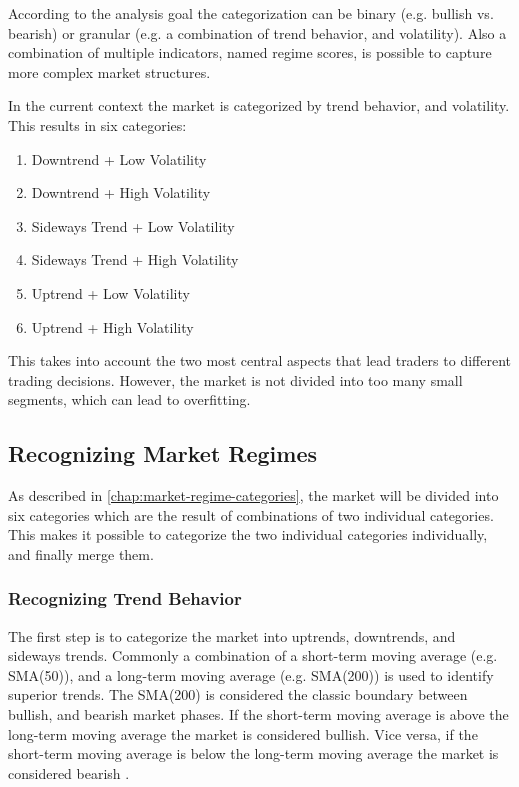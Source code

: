 According to the analysis goal the categorization can be binary (e.g.
bullish vs.
bearish) or granular (e.g.
a combination of trend behavior, and volatility).
Also a combination of multiple indicators, named regime scores, is possible to capture more complex market structures.

In the current context the market is categorized by trend behavior, and volatility.
This results in six categories:

\begin{enumerate}
    \item Downtrend + Low Volatility
    \item Downtrend + High Volatility
    \item Sideways Trend + Low Volatility
    \item Sideways Trend + High Volatility
    \item Uptrend + Low Volatility
    \item Uptrend + High Volatility
\end{enumerate}

This takes into account the two most central aspects that lead traders to different trading decisions.
However, the market is not divided into too many small segments, which can lead to overfitting.

\subsection{Recognizing Market Regimes}

As described in \autoref{chap:market-regime-categories}, the market will be divided into six categories which are the result of combinations of two individual categories.
This makes it possible to categorize the two individual categories individually, and finally merge them.

\subsubsection{Recognizing Trend Behavior}
\label{chap:recognizing-trend}

The first step is to categorize the market into uptrends, downtrends, and sideways trends.
Commonly a combination of a short-term moving average (e.g.
SMA(50)), and a long-term moving average (e.g.
SMA(200)) is used to identify superior trends.
The SMA(200) is considered the classic boundary between bullish, and bearish market phases.
If the short-term moving average is above the long-term moving average the market is considered bullish.
Vice versa, if the short-term moving average is below the long-term moving average the market is considered bearish \cite{ig-regimes-mas}.


